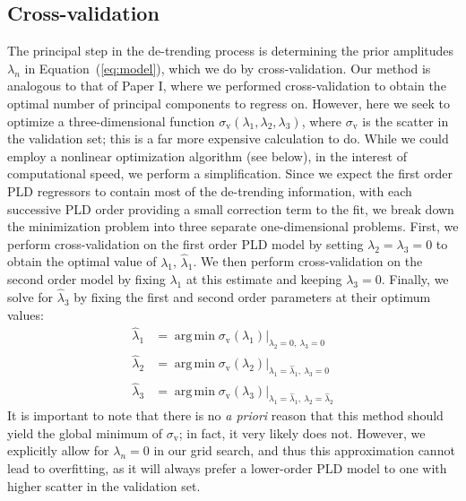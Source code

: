 \documentclass[]{emulateapj}
\DeclareMathOperator*{\argmin}{arg\,min}
\begin{document}
\subsection{Cross-validation}
\label{sec:impl_crossval}
The principal step in the de-trending process is determining the prior amplitudes $\lambda_n$ in
Equation~(\ref{eq:model}), which we do by cross-validation. Our method is analogous to
that of Paper I, where we performed cross-validation to obtain the optimal number of principal
components to regress on. However, here we seek to optimize a three-dimensional function
$\sigma_\mathrm{v}(\lambda_1, \lambda_2, \lambda_3)$, where $\sigma_\mathrm{v}$ is the scatter 
in the validation set; this is a far more expensive calculation to do.
While we could employ a nonlinear optimization
algorithm (see below), in the interest of computational speed, we perform a simplification. Since we
expect the first order PLD regressors to contain most of the de-trending information,
with each successive PLD order providing a small correction term to the fit, we break
down the minimization problem into three separate one-dimensional problems.
First, we perform cross-validation on the first order PLD model by setting $\lambda_2 = \lambda_3 = 0$
to obtain the optimal value of $\lambda_1$, $\hat{\lambda}_1$. We then perform cross-validation on the second order model
by fixing $\lambda_1$ at this estimate and keeping $\lambda_3 = 0$. Finally, we solve
for $\hat{\lambda}_3$ by fixing the first and second order parameters at their optimum
values:
%
\begin{align}
\hat{\lambda}_1 &= \argmin \sigma_\mathrm{v}(\lambda_1)\bigg|_{\lambda_2 = 0,\               \lambda_3 = 0} \nonumber\\
\hat{\lambda}_2 &= \argmin \sigma_\mathrm{v}(\lambda_2)\bigg|_{\lambda_1 = \hat{\lambda}_1,\ \lambda_3 = 0} \nonumber\\
\hat{\lambda}_3 &= \argmin \sigma_\mathrm{v}(\lambda_3)\bigg|_{\lambda_1 = \hat{\lambda}_1,\ \lambda_2 = \hat{\lambda}_2}
\end{align}
% 
It is important to note that there is no \emph{a priori} reason
that this method should yield the global minimum of $\sigma_\mathrm{v}$; in fact, it very
likely does not. However, we explicitly allow for $\lambda_n = 0$ in our grid search, and thus 
this approximation cannot lead to overfitting, as it will always prefer a lower-order PLD model to one
with higher scatter in the validation set. 
\end{document}
